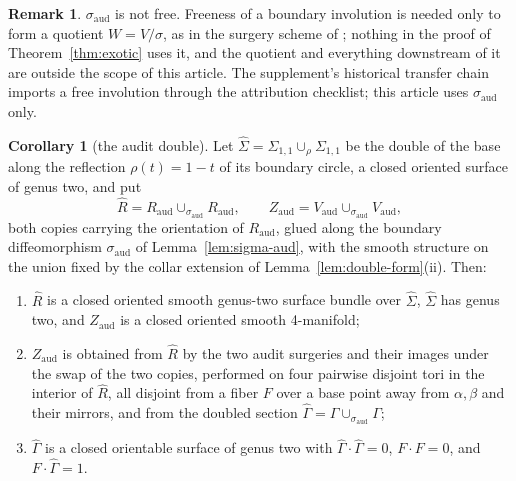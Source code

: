 \documentclass[11pt]{article}
\theoremstyle{definition}
\newtheorem{corollary}[theorem]{Corollary}
\newtheorem{remark}[theorem]{Remark}
\begin{document}
\begin{remark}
$\sigma_{\mathrm{aud}}$ is not free.  Freeness of a boundary involution is
needed only to form a quotient $W=V/\sigma$, as in the surgery scheme of
\cite{LidmanPiccirillo}; nothing in the proof of Theorem~\ref{thm:exotic}
uses it, and the quotient and everything downstream of it are outside the
scope of this article.  The supplement's historical transfer chain imports a
free involution through the attribution checklist; this article uses
$\sigma_{\mathrm{aud}}$ only.
\end{remark}

\begin{corollary}[the audit double]\label{cor:audit-double}
Let $\hat\Sigma=\Sigma_{1,1}\cup_\rho\Sigma_{1,1}$ be the double of the
base along the reflection $\rho(t)=1-t$ of its boundary circle, a closed
oriented surface of genus two, and put
\[
 \hat R=R_{\mathrm{aud}}\cup_{\sigma_{\mathrm{aud}}}R_{\mathrm{aud}},
 \qquad
 Z_{\mathrm{aud}}=V_{\mathrm{aud}}\cup_{\sigma_{\mathrm{aud}}}V_{\mathrm{aud}},
\]
both copies carrying the orientation of $R_{\mathrm{aud}}$, glued along
the boundary diffeomorphism $\sigma_{\mathrm{aud}}$ of
Lemma~\ref{lem:sigma-aud}, with the smooth structure on the union fixed by
the collar extension of Lemma~\ref{lem:double-form}(ii).  Then:
\begin{enumerate}
\item[(a)] $\hat R$ is a closed oriented smooth genus-two surface bundle
 over $\hat\Sigma$, $\hat\Sigma$ has genus two, and $Z_{\mathrm{aud}}$
 is a closed oriented smooth 4-manifold;
\item[(b)] $Z_{\mathrm{aud}}$ is obtained from $\hat R$ by the two audit
 surgeries and their images under the swap of the two copies, performed on
 four pairwise disjoint tori in the interior of $\hat R$, all disjoint from
 a fiber $F$ over a base point away from $\alpha,\beta$ and their mirrors,
 and from the doubled section
 $\hat\Gamma=\Gamma\cup_{\sigma_{\mathrm{aud}}}\Gamma$;
\item[(c)] $\hat\Gamma$ is a closed orientable surface of genus two with
 $\hat\Gamma\cdot\hat\Gamma=0$, $F\cdot F=0$, and $F\cdot\hat\Gamma=1$.
\end{enumerate}
\end{corollary}
\end{document}
